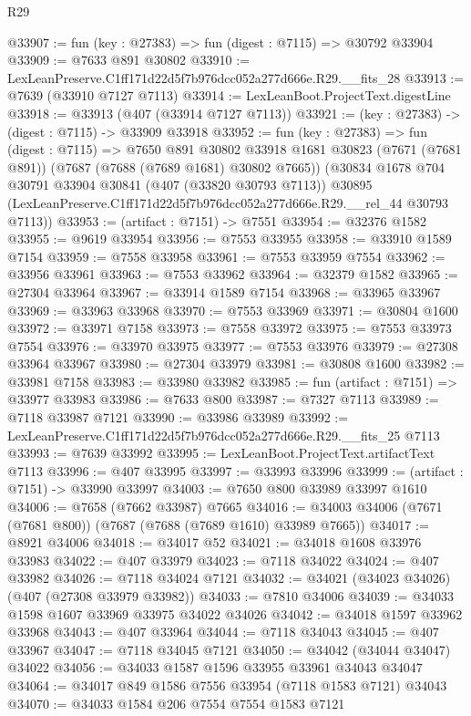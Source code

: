 \begin{lexlean}{R29}
\begin{coremodule}
@33907 := fun (key : @27383) => fun (digest : @7115) => @30792 @33904
@33909 := @7633 @891 @30802
@33910 := LexLeanPreserve.C1ff171d22d5f7b976dcc052a277d666e.R29.__fits_28
@33913 := @7639 (@33910 @7127 @7113)
@33914 := LexLeanBoot.ProjectText.digestLine
@33918 := @33913 (@407 (@33914 @7127 @7113))
@33921 := (key : @27383) -> (digest : @7115) -> @33909 @33918
@33952 := fun (key : @27383) =>
  fun (digest : @7115) =>
  @7650
    @891
    @30802
    @33918
    @1681
    @30823
    (@7671 (@7681 @891))
    (@7687 (@7688 (@7689 @1681) @30802 @7665))
    (@30834
      @1678
      @704
      @30791
      @33904
      @30841
      (@407 (@33820 @30793 @7113))
      @30895
      (LexLeanPreserve.C1ff171d22d5f7b976dcc052a277d666e.R29.__rel_44 @30793 @7113))
@33953 := (artifact : @7151) -> @7551
@33954 := @32376 @1582
@33955 := @9619 @33954
@33956 := @7553 @33955
@33958 := @33910 @1589 @7154
@33959 := @7558 @33958
@33961 := @7553 @33959 @7554
@33962 := @33956 @33961
@33963 := @7553 @33962
@33964 := @32379 @1582
@33965 := @27304 @33964
@33967 := @33914 @1589 @7154
@33968 := @33965 @33967
@33969 := @33963 @33968
@33970 := @7553 @33969
@33971 := @30804 @1600
@33972 := @33971 @7158
@33973 := @7558 @33972
@33975 := @7553 @33973 @7554
@33976 := @33970 @33975
@33977 := @7553 @33976
@33979 := @27308 @33964 @33967
@33980 := @27304 @33979
@33981 := @30808 @1600
@33982 := @33981 @7158
@33983 := @33980 @33982
@33985 := fun (artifact : @7151) => @33977 @33983
@33986 := @7633 @800
@33987 := @7327 @7113
@33989 := @7118 @33987 @7121
@33990 := @33986 @33989
@33992 := LexLeanPreserve.C1ff171d22d5f7b976dcc052a277d666e.R29.__fits_25 @7113
@33993 := @7639 @33992
@33995 := LexLeanBoot.ProjectText.artifactText @7113
@33996 := @407 @33995
@33997 := @33993 @33996
@33999 := (artifact : @7151) -> @33990 @33997
@34003 := @7650 @800 @33989 @33997 @1610
@34006 := @7658 (@7662 @33987) @7665
@34016 := @34003 @34006 (@7671 (@7681 @800)) (@7687 (@7688 (@7689 @1610) @33989 @7665))
@34017 := @8921 @34006
@34018 := @34017 @52
@34021 := @34018 @1608 @33976 @33983
@34022 := @407 @33979
@34023 := @7118 @34022
@34024 := @407 @33982
@34026 := @7118 @34024 @7121
@34032 := @34021 (@34023 @34026) (@407 (@27308 @33979 @33982))
@34033 := @7810 @34006
@34039 := @34033 @1598 @1607 @33969 @33975 @34022 @34026
@34042 := @34018 @1597 @33962 @33968
@34043 := @407 @33964
@34044 := @7118 @34043
@34045 := @407 @33967
@34047 := @7118 @34045 @7121
@34050 := @34042 (@34044 @34047) @34022
@34056 := @34033 @1587 @1596 @33955 @33961 @34043 @34047
@34064 := @34017 @849 @1586 @7556 @33954 (@7118 @1583 @7121) @34043
@34070 := @34033 @1584 @206 @7554 @7554 @1583 @7121

\end{coremodule}
\end{lexlean}
